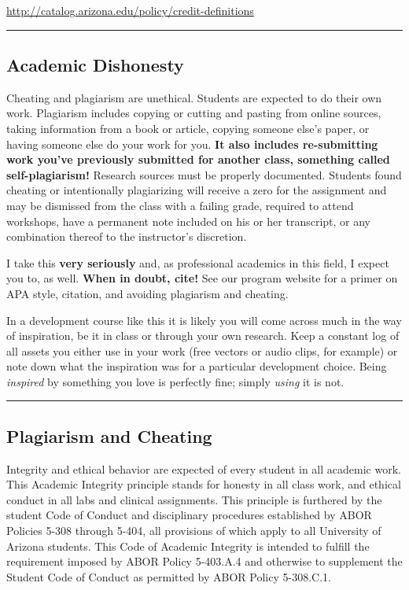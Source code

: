 \documentclass[]{article}
\begin{document}
\url{http://catalog.arizona.edu/policy/credit-definitions}

\begin{center}\rule{0.5\linewidth}{\linethickness}\end{center}

\hypertarget{academic-dishonesty}{%
\subsection{Academic Dishonesty}\label{academic-dishonesty}}

Cheating and plagiarism are unethical. Students are expected to do their
own work. Plagiarism includes copying or cutting and pasting from online
sources, taking information from a book or article, copying someone
else's paper, or having someone else do your work for you. \textbf{It
also includes re-submitting work you've previously submitted for another
class, something called self-plagiarism!} Research sources must be
properly documented. Students found cheating or intentionally
plagiarizing will receive a zero for the assignment and may be dismissed
from the class with a failing grade, required to attend workshops, have
a permanent note included on his or her transcript, or any combination
thereof to the instructor's discretion.

I take this \textbf{very seriously} and, as professional academics in
this field, I expect you to, as well. \textbf{When in doubt, cite!} See
our program website for a primer on APA style, citation, and avoiding
plagiarism and cheating.

In a development course like this it is likely you will come across much
in the way of inspiration, be it in class or through your own research.
Keep a constant log of all assets you either use in your work (free
vectors or audio clips, for example) or note down what the inspiration
was for a particular development choice. Being \emph{inspired} by
something you love is perfectly fine; simply \emph{using} it is not.

\begin{center}\rule{0.5\linewidth}{\linethickness}\end{center}

\hypertarget{plagiarism-and-cheating}{%
\subsection{Plagiarism and Cheating}\label{plagiarism-and-cheating}}

Integrity and ethical behavior are expected of every student in all
academic work. This Academic Integrity principle stands for honesty in
all class work, and ethical conduct in all labs and clinical
assignments. This principle is furthered by the student Code of Conduct
and disciplinary procedures established by ABOR Policies 5-308 through
5-404, all provisions of which apply to all University of Arizona
students. This Code of Academic Integrity is intended to fulfill the
requirement imposed by ABOR Policy 5-403.A.4 and otherwise to supplement
the Student Code of Conduct as permitted by ABOR Policy 5-308.C.1.
\end{document}
